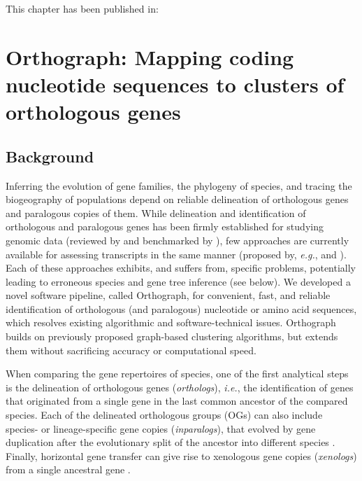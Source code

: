\begin{savequote}[75mm]
This chapter has been published in: 
\end{savequote}

\chapter{Orthograph: Mapping coding nucleotide sequences to clusters of
orthologous genes}
\label{cha:orthograph}


\section{Background}\label{background}

Inferring the evolution of gene families, the phylogeny of species, and
tracing the biogeography of populations depend on reliable delineation
of orthologous genes and paralogous copies of them. While delineation
and identification of orthologous and paralogous genes has been firmly
established for studying genomic data (reviewed by
\cite{Kristensen2011} and benchmarked by \cite{Trachana2011}), few
approaches are currently available for assessing transcripts in the same
manner (proposed by, \emph{e.g.}, \cite{Ebersberger2009} and
\cite{Schreiber2009}). Each of these approaches exhibits, and suffers
from, specific problems, potentially leading to erroneous species and
gene tree inference (see below). We developed a novel software pipeline,
called Orthograph, for convenient, fast, and reliable identification of
orthologous (and paralogous) nucleotide or amino acid sequences, which
resolves existing algorithmic and software-technical issues. Orthograph
builds on previously proposed graph-based clustering algorithms, but
extends them without sacrificing accuracy or computational speed.

When comparing the gene repertoires of species, one of the first
analytical steps is the delineation of orthologous genes
(\emph{orthologs}), \emph{i.e.}, the identification of genes that
originated from a single gene in the last common ancestor of the
compared species. Each of the delineated orthologous groups (OGs) can
also include species- or lineage-specific gene copies
(\emph{inparalogs}), that evolved by gene duplication after the
evolutionary split of the ancestor into different species
\cite{Koonin2005}. Finally, horizontal gene transfer can give rise to
xenologous gene copies (\emph{xenologs}) from a single ancestral gene
\cite{Koonin2005}.

